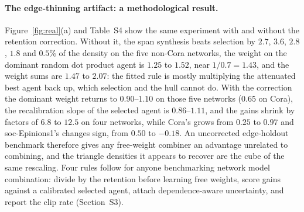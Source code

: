 \documentclass[12pt]{article}
\begin{document}
\paragraph{The edge-thinning artifact: a methodological result.}
Figure~\ref{fig:real}(a) and Table~S4 show the same experiment with and without the retention correction. Without it, the span synthesis beats selection by $2.7$, $3.6$, $2.8$, $1.8$ and $0.5\%$ of the density on the five non-Cora networks, the weight on the dominant random dot product agent is $1.25$ to $1.52$, near $1/0.7=1.43$, and the weight sums are $1.47$ to $2.07$: the fitted rule is mostly multiplying the attenuated best agent back up, which selection and the hull cannot do. With the correction the dominant weight returns to $0.90$--$1.10$ on those five networks ($0.65$ on Cora), the recalibration slope of the selected agent is $0.86$--$1.11$, and the gains shrink by factors of $6.8$ to $12.5$ on four networks, while Cora's grows from $0.25$ to $0.97$ and soc-Epinions1's changes sign, from $0.50$ to $-0.18$. An uncorrected edge-holdout benchmark therefore gives any free-weight combiner an advantage unrelated to combining, and the triangle densities it appears to recover are the cube of the same rescaling. Four rules follow for anyone benchmarking network model combination: divide by the retention before learning free weights, score gains against a calibrated selected agent, attach dependence-aware uncertainty, and report the clip rate (Section~S3).
\end{document}
